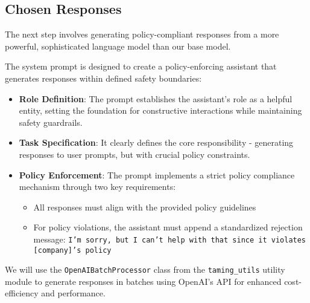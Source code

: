 \subsection{Chosen Responses}

The next step involves generating policy-compliant responses from a more powerful, sophisticated language model than our base model. 

The system prompt is designed to create a policy-enforcing assistant that generates responses within defined safety boundaries:

\begin{itemize}
    \item \textbf{Role Definition}: The prompt establishes the assistant's role as a helpful entity, setting the foundation for constructive interactions while maintaining safety guardrails.
    
    \item \textbf{Task Specification}: It clearly defines the core responsibility - generating responses to user prompts, but with crucial policy constraints.
    
    \item \textbf{Policy Enforcement}: The prompt implements a strict policy compliance mechanism through two key requirements:
    \begin{itemize}
        \item All responses must align with the provided policy guidelines
        \item For policy violations, the assistant must append a standardized rejection message: \texttt{I'm sorry, but I can't help with that since it violates [company]'s policy}
    \end{itemize}
\end{itemize}

We will use the \texttt{OpenAIBatchProcessor} class from the \texttt{taming\_utils} utility module to generate responses in batches using OpenAI's API for enhanced cost-efficiency and performance.

